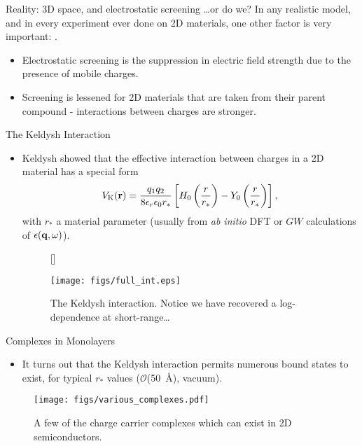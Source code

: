 \documentclass[12pt, pdf, hyperref={draft}, usenames, dvipsnames]{beamer}
\newcommand{\red}[1]{{\bf\color{LancsRed}{#1}}}
\newcommand{\green}[1]{{\bf\color{ForestGreen}{#1}}}
\begin{document}
\begin{frame}{Reality: 3D space, and electrostatic screening}
  \ldots or do we? In any realistic model, and in every experiment ever
  done on 2D materials, one other factor is very important: \green{screening}.

\begin{itemize}
  \item Electrostatic screening is the suppression in electric field strength
  due to the presence of mobile charges.
  \item Screening is lessened for 2D materials that are taken from their parent
  compound - interactions between charges are stronger.
\end{itemize}
\end{frame}

\begin{frame}{The Keldysh Interaction}
\begin{itemize}
  \item Keldysh showed that the effective interaction between charges in
  a 2D material has a special form
  \begin{equation}
    V_{\text{K}}({\bf r}) = \dfrac{q_1q_2}{8\epsilon_r \epsilon_0 r_*}
    \left[ H_0\left(\frac{r}{r_*}\right) - Y_0\left(\frac{r}{r_*}\right)
    \right],
  \end{equation}
  with $r_*$ a material parameter (usually \red{inferred} from \textit{ab initio}
  DFT or $GW$ calculations of $\epsilon({\bf q},\omega)$).
  \begin{figure}[H]
    [\FBwidth]
    {\caption{The Keldysh interaction. Notice we have recovered a
    log-dependence at short-range\ldots}\label{fig:keldysh}}
    {\texttt{[image: figs/full\_int.eps]}}
  \end{figure}

\end{itemize}
\end{frame}

\begin{frame}{Complexes in Monolayers}
\begin{itemize}
  \item It turns out that the Keldysh interaction permits numerous bound states
  to exist, for typical $r_*$ values ($\mathcal{O}$(50\ \AA), vacuum).
\end{itemize}
\begin{figure}[H]
  \centering
  \texttt{[image: figs/various\_complexes.pdf]}
  \caption{A few of the charge carrier complexes which can exist in 2D
  semiconductors.}
\label{fig:various_complexes}
\end{figure}
\end{frame}
\end{document}
